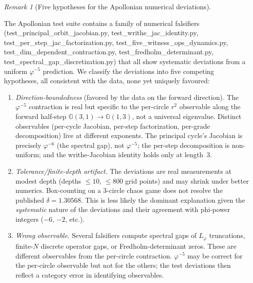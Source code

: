 \documentclass[11pt,a4paper]{article}
\theoremstyle{plain}
\theoremstyle{definition}
\theoremstyle{remark}
\newtheorem{remark}[theorem]{Remark}
\numberwithin{equation}{section}
\newcommand{\Cl}{\mathbb{G}}
\newcommand{\vp}{\varphi}
\begin{document}
\begin{remark}[Five hypotheses for the Apollonian numerical
deviations]
\label{rmk:phi5-five-hypotheses}
\begin{sloppypar}
The Apollonian test suite contains a family of numerical
falsifiers (test\_principal\_orbit\_jacobian.py,
test\_writhe\_jac\_identity.py, test\_per\_step\_jac\_factorization.py,
test\_five\_witness\_ops\_dynamics.py,
test\_dim\_dependent\_contraction.py,
test\_fredholm\_determinant.py,
test\_spectral\_gap\_discretization.py) that all show systematic
deviations from a uniform $\vp^{-5}$ prediction.  We classify
the deviations into five competing hypotheses, all consistent
with the data, none yet uniquely favoured:
\end{sloppypar}

\begin{enumerate}
  \item[\textup{(H1)}] \emph{Direction-boundedness} (favored by the
        data on the forward direction).  The $\vp^{-5}$ contraction
        is real but specific to the per-circle $r^2$ observable
        along the forward half-step $\Cl(3,1)\to\Cl(1,3)$, not a
        universal eigenvalue.  Distinct observables (per-cycle
        Jacobian, per-step factorization, per-grade decomposition)
        live at different exponents.  The principal cycle's
        Jacobian is precisely $\vp^{-6}$ (the spectral gap), not
        $\vp^{-5}$; the per-step decomposition is
        non-uniform; and the writhe-Jacobian identity holds only
        at length~3.
  \item[\textup{(H2)}] \emph{Tolerance/finite-depth artifact.}  The
        deviations are real measurements at modest depth (depths
        $\le 10$, $\le 800$ grid points) and may shrink under
        better numerics.  Box-counting on a 3-circle chaos game
        does not resolve the published $\delta=1.30568$.  This is
        less likely the dominant explanation given the
        \emph{systematic} nature of the deviations and their
        agreement with phi-power integers ($-6$, $-2$, etc.).
  \item[\textup{(H3)}] \emph{Wrong observable.}  Several falsifiers
        compute spectral gaps of $L_\vp$ truncations, finite-$N$
        discrete operator gaps, or Fredholm-determinant zeros.
        These are different observables from the per-circle
        contraction.  $\vp^{-5}$ may be correct for the per-circle
        observable but not for the others; the test deviations
        then reflect a category error in identifying observables.

\end{enumerate}
\end{remark}
\end{document}

